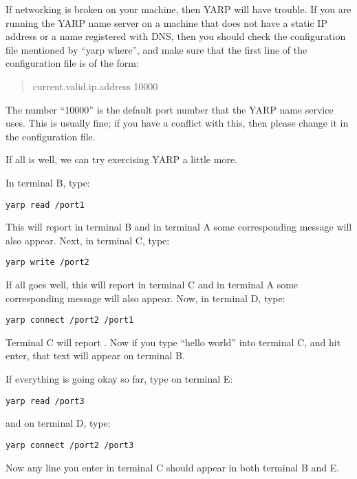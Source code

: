 If networking is broken on your machine, then YARP will have trouble.
If you are running the YARP name server on a machine that does not
have a static IP address or a name registered with DNS, then you
should check the configuration file mentioned by ``yarp where'', and
make sure that the first line of the configuration file is of the form:
\begin{quote}
  current.valid.ip.address 10000
\end{quote}

The number ``10000'' is the default port number that the YARP name
service uses.  This is usually fine; if you have a conflict with this,
then please change it in the configuration file.

If all is well, we can try exercising YARP a little more.

In terminal B, type:
%
\begin{verbatim}
yarp read /port1
\end{verbatim}
%
This will report  in terminal B and in
terminal A some corresponding message will also appear.
%
Next, in terminal C, type:

\begin{verbatim}
yarp write /port2
\end{verbatim}

If all goes well, this will report  in
terminal C and in terminal A some corresponding message will also
appear.
%
Now, in terminal D, type:

\begin{verbatim}
yarp connect /port2 /port1
\end{verbatim}

Terminal C will report .  Now if
you type ``hello world'' into terminal C, and hit enter, that text
will appear on terminal B.


If everything is going okay so far, type on terminal E:
%
\begin{verbatim}
yarp read /port3
\end{verbatim}
%
and on terminal D, type:
%
\begin{verbatim}
yarp connect /port2 /port3
\end{verbatim}
%
Now any line you enter in terminal C should appear in both terminal B and E.
